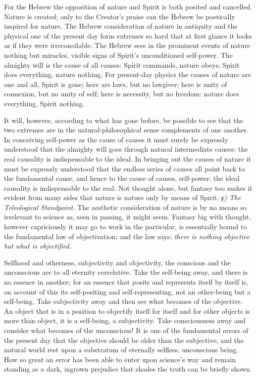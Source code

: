 \documentclass[12pt,a4paper]{book}
\newcommand{\subrunin}[1]{\emph{#1}\hspace{0.4em}}
\begin{document}
For the Hebrew the opposition of nature and Spirit is both posited and cancelled. Nature is created; only to the
Creator's praise can the Hebrew be poetically inspired for nature. The Hebrew consideration of nature in antiquity and
the physical one of the present day form extremes so hard that at first glance it looks as if they were irreconcilable.
The Hebrew sees in the prominent events of nature nothing but miracles, visible signs of Spirit's unconditioned
self-power. The almighty will is the cause of all causes: Spirit commands, nature obeys; Spirit does everything, nature
nothing. For present-day physics the causes of nature are one and all, Spirit is gone; here are laws, but no lawgiver;
here is unity of connexion, but no unity of self; here is necessity, but no freedom: nature does everything, Spirit
nothing.

It will, however, according to what has gone before, be possible to see that the two extremes are in the
natural-philosophical sense complements of one another. In conceiving self-power as the cause of causes it must surely be
expressly understood that the almighty will goes through natural intermediate causes: the real causality is
indispensable to the ideal. In bringing out the causes of nature it must be expressly understood that the endless series
of causes all point back to the fundamental cause, and hence to the cause of causes, self-power: the ideal causality is
indispensable to the real. Not thought alone, but fantasy too makes it evident from many sides that nature is nature only
by means of Spirit.
\subrunin{γ) The Teleological Standpoint.} The aesthetic consideration of nature is by no means so irrelevant to science
as, seen in passing, it might seem. Fantasy big with thought, however capriciously it may go to work in the particular,
is essentially bound to the fundamental law of objectivation; and the law says: \emph{there is nothing objective but what
is objectified.}

Selfhood and otherness, subjectivity and objectivity, the conscious and the unconscious are to all eternity correlative.
Take the self-being away, and there is no essence in another; for an essence that posits and represents itself by itself
is, on account of this its self-positing and self-representing, not an other-being but a self-being. Take subjectivity
away and then see what becomes of the objective. An object that is in a position to objectify itself for itself and for
other objects is more than object, it is a self-being, a subjectivity. Take consciousness away and consider what becomes
of the unconscious! It is one of the fundamental errors of the present day that the objective should be older than the
subjective, and the natural world rest upon a substratum of eternally selfless, unconscious being. How so great an error
has been able to enter upon science's way and remain standing as a dark, ingrown prejudice that shades the truth can be
briefly shown.
\end{document}
